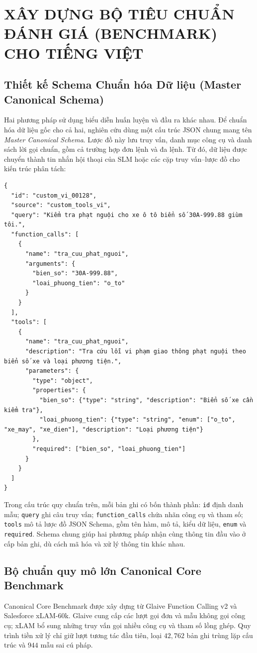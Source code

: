 \chapter{XÂY DỰNG BỘ TIÊU CHUẨN ĐÁNH GIÁ (BENCHMARK) CHO TIẾNG VIỆT}

\section{Thiết kế Schema Chuẩn hóa Dữ liệu (Master Canonical Schema)}
Hai phương pháp sử dụng biểu diễn huấn luyện và đầu ra khác nhau. Để chuẩn hóa dữ liệu gốc cho cả hai, nghiên cứu dùng một cấu trúc JSON chung mang tên \textit{Master Canonical Schema}. Lược đồ này lưu truy vấn, danh mục công cụ và danh sách lời gọi chuẩn, gồm cả trường hợp đơn lệnh và đa lệnh. Từ đó, dữ liệu được chuyển thành tin nhắn hội thoại của SLM hoặc các cặp truy vấn–lược đồ cho kiến trúc phân tách:

\begin{verbatim}
{
  "id": "custom_vi_00128",
  "source": "custom_tools_vi",
  "query": "Kiểm tra phạt nguội cho xe ô tô biển số 30A-999.88 giùm tôi.",
  "function_calls": [
    {
      "name": "tra_cuu_phat_nguoi",
      "arguments": {
        "bien_so": "30A-999.88",
        "loai_phuong_tien": "o_to"
      }
    }
  ],
  "tools": [
    {
      "name": "tra_cuu_phat_nguoi",
      "description": "Tra cứu lỗi vi phạm giao thông phạt nguội theo biển số xe và loại phương tiện.",
      "parameters": {
        "type": "object",
        "properties": {
          "bien_so": {"type": "string", "description": "Biển số xe cần kiểm tra"},
          "loai_phuong_tien": {"type": "string", "enum": ["o_to", "xe_may", "xe_dien"], "description": "Loại phương tiện"}
        },
        "required": ["bien_so", "loai_phuong_tien"]
      }
    }
  ]
}
\end{verbatim}

Trong cấu trúc quy chuẩn trên, mỗi bản ghi có bốn thành phần: \texttt{id} định danh mẫu; \texttt{query} ghi câu truy vấn; \texttt{function_calls} chứa nhãn công cụ và tham số; \texttt{tools} mô tả lược đồ JSON Schema, gồm tên hàm, mô tả, kiểu dữ liệu, \texttt{enum} và \texttt{required}. Schema chung giúp hai phương pháp nhận cùng thông tin đầu vào ở cấp bản ghi, dù cách mã hóa và xử lý thông tin khác nhau.

\section{Bộ chuẩn quy mô lớn Canonical Core Benchmark}
Canonical Core Benchmark được xây dựng từ Glaive Function Calling v2 và Salesforce xLAM-60k. Glaive cung cấp các lượt gọi đơn và mẫu không gọi công cụ; xLAM bổ sung những truy vấn gọi nhiều công cụ và tham số lồng ghép. Quy trình tiền xử lý chỉ giữ lượt tương tác đầu tiên, loại $42{,}762$ bản ghi trùng lặp cấu trúc và $944$ mẫu sai cú pháp.

